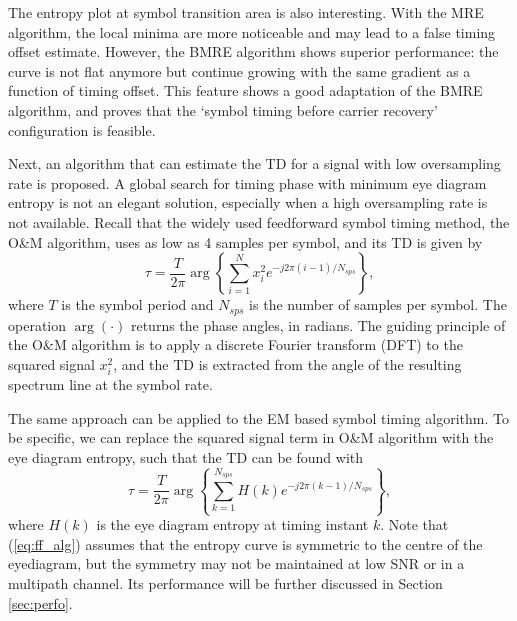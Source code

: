 \documentclass[journal,comsoc, onecolumn, 12pt,draftclsnofoot]{IEEEtran} %
\begin{document}
The entropy plot at symbol transition area is also interesting.
With the MRE algorithm, the local minima are more noticeable and may lead to a false timing offset estimate.
However, the BMRE algorithm shows superior performance:
the curve is not flat anymore but continue growing with the same gradient as a function of timing offset.
This feature shows a good adaptation of the BMRE algorithm, and proves that the `symbol timing before carrier recovery' configuration is feasible.

Next, an algorithm that can estimate the TD for a signal with low oversampling rate is proposed.
A global search for timing phase with minimum eye diagram entropy is not an elegant solution, especially when a high oversampling rate is not available.
Recall that the widely used feedforward symbol timing method, the O\&M algorithm, uses as low as 4 samples per symbol, and its TD is given by
\begin{equation}
\tau=\frac{T}{2\pi}\arg \left\{ {\sum\limits_{i = 1}^{N} {x_i^2{e^{ - j2\pi (i-1)/N_{sps}}}} } \right\},
\label{eq:om}
\end{equation}
where \(T\) is the symbol period and \(N_{sps}\) is the number of samples per symbol.
The operation \(\arg( \cdot )\) returns the phase angles, in radians.
The guiding principle of the O\&M algorithm is to apply a discrete Fourier transform (DFT) to the squared signal \(x_i^2\),
and the TD is extracted from the angle of the resulting spectrum line at the symbol rate.

The same approach can be applied to the EM based symbol timing algorithm.
To be specific, we can replace the squared signal term in O\&M algorithm with the eye diagram entropy,
such that the TD can be found with
\begin{equation}
\tau  = \frac{T}{{2\pi }}\arg \left\{ {\sum\limits_{k = 1}^{N_{sps}} {H(k){e^{ - j2\pi (k-1)/N_{sps}}}} } \right\},
\label{eq:ff_alg}
\end{equation}
where \(H(k)\) is the eye diagram entropy at timing instant \(k\).
Note that (\ref{eq:ff_alg}) assumes that the entropy curve is symmetric to the centre of the eyediagram,
but the symmetry may not be maintained at low SNR or in a multipath channel.
Its performance will be further discussed in Section \ref{sec:perfo}.
\end{document}
